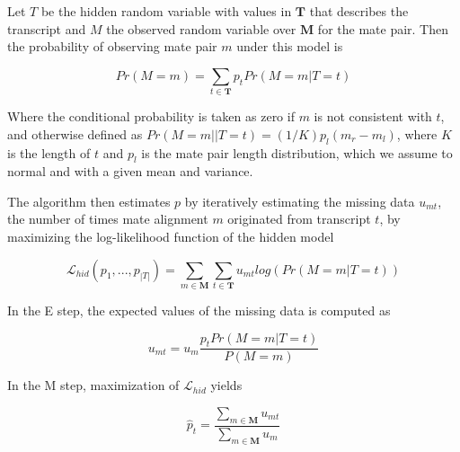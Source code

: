 \documentclass[twocolumn]{homework}
\theoremstyle{definition}
\begin{document}
Let $T$ be the hidden random variable with values in $\mathbf{T}$ that
describes the transcript and $M$ the observed random variable over
$\mathbf{M}$ for the mate pair. Then the probability of observing mate pair
$m$ under this model is

\begin{equation*} 
    Pr(M=m) = \sum_{t \in \mathbf{T}} p_t Pr(M=m|T=t)
\end{equation*}

Where the conditional probability is taken as zero if $m$ is not consistent
with $t$, and otherwise defined as $Pr(M=m||T=t) = (1/K)p_l(m_r - m_l)$, where
$K$ is the length of $t$ and $p_l$ is the mate pair length distribution, which
we assume to normal and with a given mean and variance.

The algorithm then estimates $p$ by iteratively estimating the missing data
$u_{mt}$, the number of times mate alignment $m$ originated from transcript
$t$, by maximizing the log-likelihood function of the hidden model

\begin{equation*}
    \mathcal{L}_{hid}(p_1,...,p_{|T|}) = \sum_{m \in \mathbf{M}} \sum_{t \in \mathbf{T}} u_{mt} log( Pr(M=m|T=t) )
\end{equation*}

In the E step, the expected values of the missing data is computed as 

\begin{equation*}
    u_{mt} = u_m \frac{p_t Pr(M=m|T=t)}{P(M=m)}
\end{equation*}

In the M step, maximization of $\mathcal{L}_{hid}$ yields 

\begin{equation*}
    \hat{p}_t = \frac{\sum_{m \in \mathbf{M}} u_{mt} }{\sum_{m \in \mathbf{M}} u_m}
\end{equation*}

  
\end{document}
